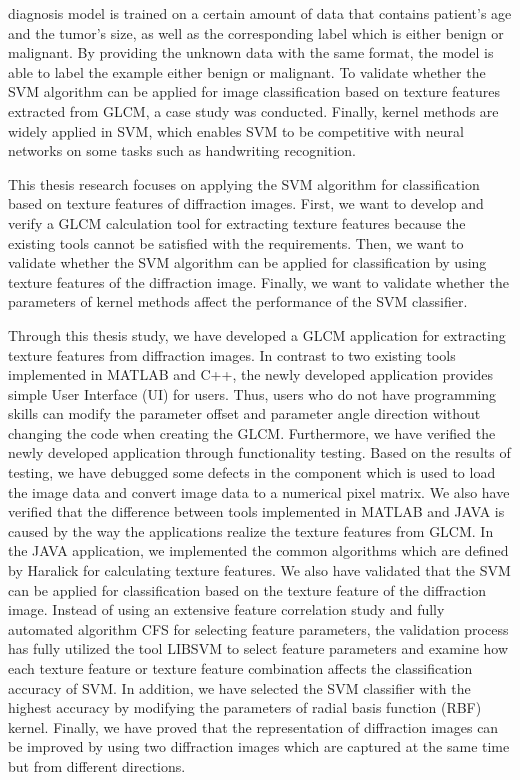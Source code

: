 diagnosis model is trained on a certain amount of data that contains patient's age and the tumor's size, as well as the corresponding label which is either benign or malignant. By providing the unknown data with the same format, the model is able to label the example either benign or malignant. To validate whether the SVM algorithm can be applied for image classification based on texture features extracted from GLCM, a case study was conducted. Finally, kernel methods are widely applied in SVM, which enables SVM to be competitive with neural networks on some tasks such as handwriting recognition\cite{Aizerman}.   \par 
This thesis research focuses on applying the SVM algorithm for classification based on texture features of diffraction images. First, we want to develop and verify a GLCM calculation tool for extracting texture features because the existing tools cannot be satisfied with the requirements. Then, we want to validate whether the SVM algorithm can be applied for classification by using texture features of the diffraction image. Finally, we want to validate whether the parameters of kernel methods affect the performance of the SVM classifier. \par
Through this thesis study, we have developed a GLCM application for extracting texture features from diffraction images. In contrast to two existing tools implemented in MATLAB and C++, the newly developed application provides simple User Interface (UI) for users. Thus, users who do not have programming skills can modify the parameter offset and parameter angle direction without changing the code when creating the GLCM. Furthermore, we have verified the newly developed application through functionality testing. Based on the results of testing, we have debugged some defects in the component which is used to load the image data and convert image data to a numerical pixel matrix. We also have verified that the difference between tools implemented in MATLAB and JAVA is caused by the way the applications realize the texture features from GLCM. In the JAVA application, we implemented the common algorithms which are defined by Haralick for calculating texture features\cite{Haralick}. We also have validated that the SVM can be applied for classification based on the texture feature of the diffraction image. Instead of using an extensive feature correlation study and fully automated algorithm CFS for selecting feature parameters, the validation process has fully utilized the tool LIBSVM to select feature parameters and examine how each texture feature or texture feature combination affects the classification accuracy of SVM. In addition, we have selected the SVM classifier with the highest accuracy by modifying the parameters of radial basis function (RBF) kernel. Finally, we have proved that the representation of diffraction images can be improved by using two diffraction images which are captured at the same time but from different directions. \par
